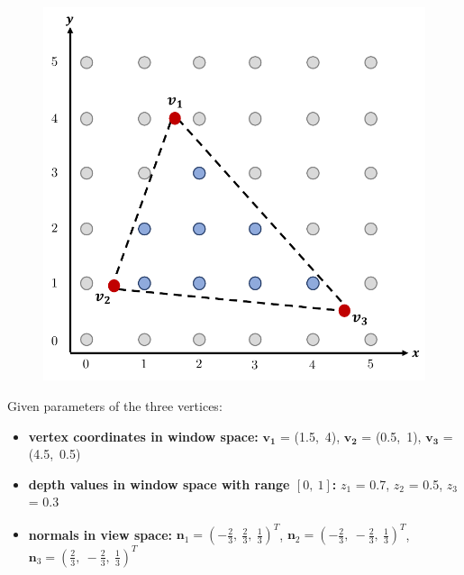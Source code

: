 \documentclass[conference]{styles/acmsiggraph}
\renewcommand{\vec}[1]{\mathbf{#1}}
\begin{document}
\begin{figure}[t!]
\centering
\includegraphics[scale=0.6]{imgs/shader}
\end{figure}

 Given parameters of the three vertices:

\begin{itemize}
\item \textbf{vertex coordinates in window space:} $\vec{v_1}$ = (1.5,\ 4),  $\vec{v_2}$ = (0.5,\ 1), $\vec{v_3}$ = (4.5,\ 0.5)
\item \textbf{depth values in window space with range $[0,\ 1]$:} $z_{1}$ = 0.7, $z_{2}$ = 0.5, $z_{3}$ = 0.3
\item \textbf{normals in view space:} $\vec{n}_1 = (-\frac{2}{3},\ \frac{2}{3},\ \frac{1}{3})^T$, $\vec{n}_2 = (-\frac{2}{3},\ -\frac{2}{3},\ \frac{1}{3})^T$, $\vec{n}_3 = (\frac{2}{3},\ -\frac{2}{3},\ \frac{1}{3})^T$
\end{itemize}
\end{document}
